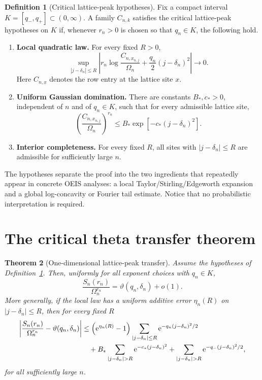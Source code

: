 \documentclass[11pt,a4paper]{article}
\numberwithin{equation}{section}
\newtheorem{theorem}{Theorem}[section]
\theoremstyle{definition}
\newtheorem{definition}[theorem]{Definition}
\newcommand{\ee}{\mathrm e}
\begin{document}
\begin{definition}[Critical lattice-peak hypotheses]\label{tbs:lpt:def:hyp}
Fix a compact interval $K=[q_-,q_+]\subset(0,\infty)$. A family $C_{n,k}$
satisfies the critical lattice-peak hypotheses on $K$ if, whenever
$r_n>0$ is chosen so that $q_n\in K$, the following hold.
\begin{enumerate}[label=\textup{(H\arabic*)}]
\item \textbf{Local quadratic law.} For every fixed $R>0$,
\begin{equation}\label{tbs:lpt:eq:localquad}
 \sup_{|j-\delta_n|\le R}
 \left|r_n\log\frac{C_{n,x_{n,j}}}{\Omega_n}
 +\frac{q_n}{2}(j-\delta_n)^2\right|\longrightarrow0.
\end{equation}
Here $C_{n,x}$ denotes the row entry at the lattice site $x$.
\item \textbf{Uniform Gaussian domination.} There are constants
$B_*,c_*>0$, independent of $n$ and of $q_n\in K$, such that for every
admissible lattice site,
\begin{equation}\label{tbs:lpt:eq:gaussdom}
 \left(\frac{C_{n,x_{n,j}}}{\Omega_n}\right)^{r_n}
 \le B_*\exp[-c_*(j-\delta_n)^2].
\end{equation}
\item \textbf{Interior completeness.} For every fixed $R$, all sites with
$|j-\delta_n|\le R$ are admissible for sufficiently large $n$.
\end{enumerate}
\end{definition}

The hypotheses separate the proof into the two ingredients that
repeatedly appear in concrete OEIS analyses: a local
Taylor/Stirling/Edgeworth expansion and a global log-concavity or Fourier
tail estimate. Notice that no probabilistic interpretation is required.

\section{The critical theta transfer theorem}\label{tbs:lpt:sec:transfer}

\begin{theorem}[One-dimensional lattice-peak transfer]\label{tbs:lpt:thm:transfer}
Assume the hypotheses of Definition~\ref{tbs:lpt:def:hyp}. Then,
uniformly for all exponent choices with $q_n\in K$,
\begin{equation}\label{tbs:lpt:eq:maintransfer}
 \frac{S_n(r_n)}{\Omega_n^{r_n}}
 =\vartheta(q_n,\delta_n)+o(1).
\end{equation}
More generally, if the local law has a uniform additive error
$\eta_n(R)$ on $|j-\delta_n|\le R$, then for every fixed $R$
\begin{align}\label{tbs:lpt:eq:explicitbound}
 \left|\frac{S_n(r_n)}{\Omega_n^{r_n}}-\vartheta(q_n,\delta_n)\right|
 &\le \left(\ee^{\eta_n(R)}-1\right)
       \sum_{|j-\delta_n|\le R}\ee^{-q_n(j-\delta_n)^2/2}\\
 &\quad +B_*\sum_{|j-\delta_n|>R}\ee^{-c_*(j-\delta_n)^2}
       +\sum_{|j-\delta_n|>R}\ee^{-q_-(j-\delta_n)^2/2},\notag
\end{align}
for all sufficiently large $n$.
\end{theorem}
\end{document}
